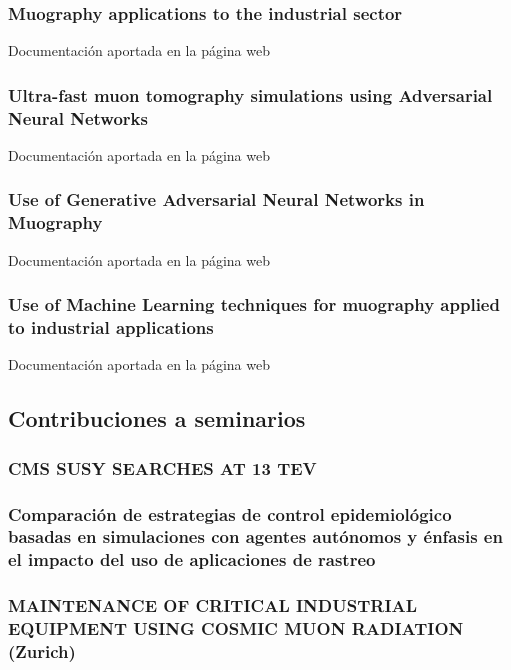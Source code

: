 \documentclass[a4paper, 11pt, twoside, openright]{report}
\begin{document}
\subsubsection{Muography applications to the industrial sector}
%
Documentación aportada en la página web
\subsubsection{Ultra-fast muon tomography simulations using Adversarial Neural Networks}
%
Documentación aportada en la página web
\subsubsection{Use of Generative Adversarial Neural Networks in Muography}
Documentación aportada en la página web
\subsubsection{Use of Machine Learning techniques for muography applied to industrial applications}
%
Documentación aportada en la página web





\subsection{Contribuciones a seminarios}

\subsubsection{CMS SUSY SEARCHES AT 13 TEV}


\subsubsection{Comparación de estrategias de control epidemiológico basadas en simulaciones con agentes autónomos y énfasis en el impacto del uso de aplicaciones de rastreo}


\subsubsection{MAINTENANCE OF CRITICAL INDUSTRIAL EQUIPMENT USING COSMIC MUON RADIATION (Zurich)}

\end{document}
